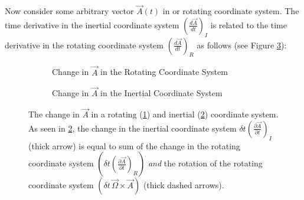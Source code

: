 Now consider some arbitrary vector $\vec{A}(t)$ in or rotating coordinate system. The time derivative in the inertial coordinate system $\left(\frac{d\vec{A}}{dt}\right)_I$ is related to the time derivative in the rotating coordinate system $\left(\frac{d\vec{A}}{dt}\right)_R$ as follows (see Figure \ref{Inertial to Rotating}):
\begin{figure}[H]
    \centering
    \begin{subfigure}{0.45\linewidth}
        \centering
        \caption{Change in $\vec{A}$ in the Rotating Coordinate System}
        \label{Rotating}
    \end{subfigure}
    \hfill
    \begin{subfigure}{0.45\linewidth}
        \centering
        \caption{Change in $\vec{A}$ in the Inertial Coordinate System}
        \label{Inertial}
    \end{subfigure}
    \caption{The change in $\vec{A}$ in a rotating (\ref{Rotating}) and inertial (\ref{Inertial}) coordinate system. As seen in \ref{Inertial}, the change in the inertial coordinate system $\delta t \left( \frac{\partial \vec{A}}{\partial t} \right)_I$ (thick arrow) is equal to sum of the change in the rotating coordinate system $\left( \delta t \left( \frac{\partial \vec{A}}{\partial t} \right)_R \right)$ \textit{and} the rotation of the rotating coordinate system $\left(\delta t\,\vec{\Omega}\times\vec{A} \right)$ (thick dashed arrows).}
    \label{Inertial to Rotating}
\end{figure}
